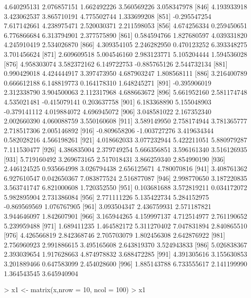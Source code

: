 \documentclass[12pt]{article}
\begin{document}
\begin{Schunk}
\begin{Soutput}
 [841]  4.640295131  2.076857151  1.662492226  3.560569226  3.058347978
 [846]  4.193933918  3.423062537  3.865710191  4.775502744  1.333699208
 [851] -0.295547254  7.617142661  4.238975471  2.520030371  2.211598053
 [856]  4.674256334  0.259450651  6.776866684  6.313794901  2.377575890
 [861]  0.584594766  1.827680597  4.039331820  4.245910419  2.534026870
 [866]  4.309354105  2.246282950  0.470123252  6.393348275  3.701456624
 [871]  2.609609518  5.004546160  2.983123771  5.105204444  1.594536028
 [876]  4.958303074  3.582372162  6.149722753 -0.885765126  2.544732134
 [881]  0.990429018  4.424444917  3.397473950  4.687903247  1.808568111
 [886]  3.216400789  0.666612188  6.148819773  0.164178310  1.648245271
 [891] -0.395906019  2.312338790  3.904500063  2.112317968  4.688663672
 [896]  5.661952160  2.581174748  4.535021481 -0.415079141  0.203637758
 [901]  6.183368890  5.155048903 -0.379141112  4.019884072  4.696945072
 [906]  3.048581022  2.167352340  2.002660390  4.060088759  3.550160608
 [911]  3.589149950  2.758174944  3.781365777  2.718517306  2.005146892
 [916] -0.809658206 -1.003727276  3.419634344  0.582028216  4.566198261
 [921]  4.018662033  3.077232944  5.422211051  5.880979287  7.111530477
 [926]  4.386835004  2.379749254  5.666356851  3.596161340  3.516126935
 [931]  5.719160492  3.269673165  2.517018431  3.866259340  2.854990190
 [936]  2.446124525  0.935664998  3.026794438  2.656125671  4.780070816
 [941]  3.408761362  6.927610547  0.042650367  7.083877524  2.516877087
 [946]  2.998770650  3.187220835  3.563741747  6.821000608  1.720352550
 [951]  0.103681688  3.572819211  0.034172072  5.982895904  2.731386084
 [956]  2.771111226  5.135422734  5.284152975 -0.869569569  1.076767905
 [961]  3.093504347  2.436759931  2.571187821  3.944646097  1.842607901
 [966]  3.165944265  4.159997137  4.712514977  2.761190652  5.239959488
 [971]  1.689411235  1.464582172  5.311270402  7.047831894  2.840865510
 [976]  4.426566819  2.842368746  2.705703079  1.802456308  2.642876922
 [981]  2.756960923  2.991886615  3.495165608  2.643819370  3.524943833
 [986]  5.026838367  2.393039654  1.917628663  4.874978832  3.688472285
 [991]  4.391305616  3.155630853  3.201889466  0.647583099  2.454028600
 [996]  1.885143788  6.733555617  2.141199990  1.364543545  3.645940904
\end{Soutput}
\begin{Sinput}
> x1 <- matrix(x,nrow = 10, ncol = 100) 
> x1
\end{Sinput}
\begin{Soutput}
            [,1]      [,2]       [,3]      [,4]     [,5]     [,6]       [,7]

\end{Soutput}
\end{Schunk}
\end{document}
